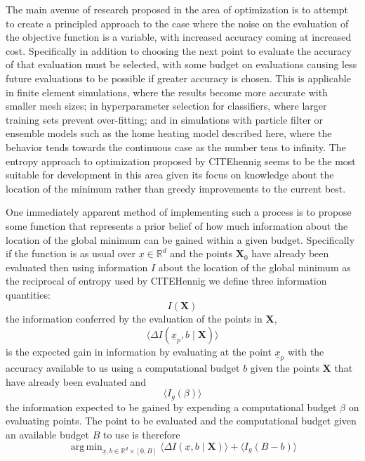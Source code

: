 \documentclass[a4paper, 10 pt, conference]{ieeeconf}  %
\DeclareMathOperator*{\argmin}{arg\,min}
\begin{document}
The main avenue of research proposed in the area of optimization is to attempt to create a principled approach to the case where the noise on the evaluation of the objective function is a variable, with increased accuracy coming at increased cost. Specifically in addition to choosing the next point to evaluate the accuracy of that evaluation must be selected, with some budget on evaluations causing less future evaluations to be possible if greater accuracy is chosen. This is applicable in finite element simulations, where the results become more accurate with smaller mesh sizes; in hyperparameter selection for classifiers, where larger training sets prevent over-fitting; and in simulations with particle filter or ensemble models such as the home heating model described here, where the behavior tends towards the continuous case as the number tens to infinity. The entropy approach to optimization proposed by CITEhennig seems to be the most suitable for development in this area given its focus on knowledge about the location of the minimum rather than greedy improvements to the current best.

One immediately apparent method of implementing such a process is to propose some function that represents a prior belief of how much information about the location of the global minimum can be gained within a given budget. Specifically if the function is as usual over $\underline{x} \in \mathbb{R}^{d}$ and the points $\mathbf{X}_{0}$ have already been evaluated then using information $I$ about the location of the global minimum as the reciprocal of entropy used by CITEHennig we define three information quantities:
\begin{equation}
I(\mathbf{X})
\end{equation}
the information conferred by the evaluation of the points in $\mathbf{X}$,
\begin{equation}
\langle\Delta I(\underline{x}_{p},b \mid \mathbf{X})\rangle
\end{equation}
is the expected gain in information by evaluating at the point $\underline{x}_{p}$ with the accuracy available to us using a computational budget $b$ given the points $\mathbf{X}$ that have already been evaluated and
\begin{equation}
\langle I_{g}(\beta)\rangle
\end{equation}
the information expected to be gained by expending a computational budget $\beta$ on evaluating points.
The point to be evaluated and the computational budget given an available budget $B$ to use is therefore
\begin{equation}
\argmin_{\underline{x},b \in \mathbb{R}^{d} \times [0,B]} \langle\Delta I(\underline{x},b \mid \mathbf{X})\rangle + \langle I_{g}(B-b)\rangle
\end{equation}
\end{document}

